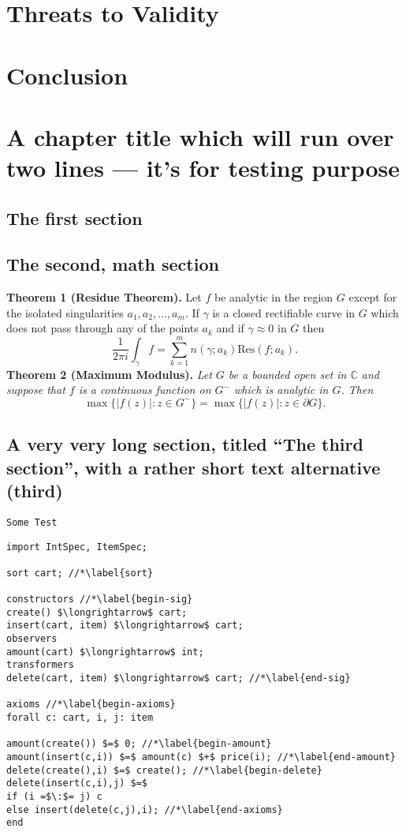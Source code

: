 \documentclass[mscthesis,20pt]{usiinfthesis}
\begin{document}
\chapter{Threats to Validity}

\chapter{Conclusion}

\chapter[Short title]{A chapter title which will run over two lines --- it's for
  testing purpose}

\lipsum[1-2]

\section{The first section}
\lipsum[3-4]

 \section{The second, math section}

\textbf{Theorem 1 (Residue Theorem).}
Let $f$ be analytic in the region $G$ except for the isolated singularities $a_1,a_2,\ldots,a_m$. If $\gamma$ is a closed rectifiable curve in $G$ which does not pass through any of the points $a_k$ and if $\gamma\approx 0$ in $G$ then
\[
\frac{1}{2\pi i}\int_\gamma f = \sum_{k=1}^m n(\gamma;a_k) \text{Res}(f;a_k).
\]
\textbf{Theorem 2 (Maximum Modulus).}
\emph{Let $G$ be a bounded open set in $\mathbb{C}$ and suppose that $f$ is a continuous function on $G^-$ which is analytic in $G$. Then}
\[
\max\{|f(z)|:z\in G^-\}=\max \{|f(z)|:z\in \partial G \}.
\]

\section[third]{A very very long section, titled ``The third section'', with
  a rather  short text alternative (third)}
\lipsum \texttt{Some Test}
\begin{lstlisting}
import IntSpec, ItemSpec;

sort cart; //*\label{sort}

constructors //*\label{begin-sig}
create() $\longrightarrow$ cart;
insert(cart, item) $\longrightarrow$ cart;
observers
amount(cart) $\longrightarrow$ int;
transformers
delete(cart, item) $\longrightarrow$ cart; //*\label{end-sig}

axioms //*\label{begin-axioms}
forall c: cart, i, j: item 

amount(create()) $=$ 0; //*\label{begin-amount}
amount(insert(c,i)) $=$ amount(c) $+$ price(i); //*\label{end-amount}
delete(create(),i) $=$ create(); //*\label{begin-delete}
delete(insert(c,i),j) $=$
if (i =$\:$= j) c
else insert(delete(c,j),i); //*\label{end-axioms}
end
\end{lstlisting}
\end{document}
